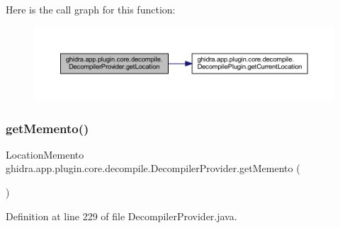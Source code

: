 Here is the call graph for this function\+:
\nopagebreak
\begin{figure}[H]
\begin{center}
\leavevmode
\includegraphics[width=350pt]{classghidra_1_1app_1_1plugin_1_1core_1_1decompile_1_1_decompiler_provider_a38fd2ce84b83587100a537a0349fc77f_cgraph}
\end{center}
\end{figure}
\mbox{\label{classghidra_1_1app_1_1plugin_1_1core_1_1decompile_1_1_decompiler_provider_a8e59155af3132b464c1c9e682a2d1fd7}} 
\subsubsection{\texorpdfstring{getMemento()}{getMemento()}}
{\footnotesize\ttfamily Location\+Memento ghidra.\+app.\+plugin.\+core.\+decompile.\+Decompiler\+Provider.\+get\+Memento (\begin{DoxyParamCaption}{ }\end{DoxyParamCaption})\hspace{0.3cm}{\ttfamily [inline]}}



Definition at line 229 of file Decompiler\+Provider.\+java.

